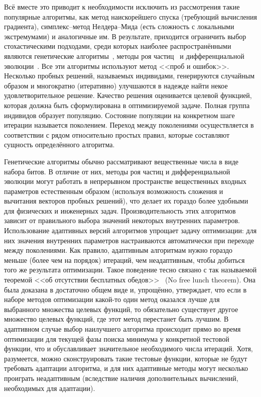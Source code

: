 Всё вместе это приводит к необходимости исключить из рассмотрения
такие популярные алгоритмы, как метод наискорейшего спуска (требующий
вычисления градиента), симплекс--метод Нелдера--Мида (есть сложность с
локальными экстремумами) и аналогичные им. В результате, приходится
ограничить выбор стохастическими подходами, среди которых наиболее
распространёнными являются генетические
алгоритмы~\cite{Goldberg-GA-1989}, методы  роя
частиц~\cite{Kennedy-PSO-1995} и дифференциальной
эволюции~\cite{Storn-DE-first-1997}.  Все эти алгоритмы используют
метод <<проб и ошибок>>.  Несколько пробных решений, называемых
индивидами, генерируются случайным образом и многократно (итеративно)
улучшаются в надежде найти некое удовлетворительное решение. Качество
решения оценивается целевой функцией, которая должна быть
сформулирована в оптимизируемой задаче.  Полная группа индивидов
образует популяцию.  Состояние популяции на конкретном шаге итерации
называется поколением.  Переход между поколениями осуществляется в
соответствии с рядом относительно простых правил, которые составляют
сущность определённого алгоритма.

Генетические алгоритмы обычно рассматривают вещественные числа в виде
набора битов.  В отличие от них, методы роя частиц и дифференциальной
эволюции могут работать в непрерывном пространстве вещественных
входных параметров естественным образом (используя возможность
сложения и вычитания векторов пробных решений), что делает их гораздо
более удобными для физических и инженерных задач.  Производительность
этих алгоритмов зависит от правильного выбора значений некоторых
внутренних параметров.  Использование адаптивных версий алгоритмов
упрощает задачу оптимизации: для них значения внутренних параметров
настраиваются автоматически при переходе между поколениями. Как
правило, адаптивным алгоритмам нужно гораздо меньше (более чем на
порядок) итераций, чем неадаптивным, чтобы добиться того же результата
оптимизации. Такое поведение тесно связано с так называемой теоремой
<<об отсутствии бесплатных обедов>>~\cite{Wolpert-NFL-1997} (No free
lunch theorem). Она была доказана в достаточно общем виде и,
упрощённо, утверждает, что если в наборе методов оптимизации какой-то
один метод оказался лучше для выбранного множества целевых функций, то
обязательно существует другое множество целевых функций, где этот
метод перестанет быть лучшим. В адаптивном случае выбор наилучшего
алгоритма происходит прямо во время оптимизации для текущей фазы
поиска минимума у конкретной тестовой функции, что и обуславливает
значительное необходимого числа итераций. Хотя, разумеется, можно
сконструировать такие тестовые функции, которые не будут требовать
адаптации алгоритма, и для них адаптивные методы могут несколько
проиграть неадаптивным (вследствие наличия дополнительных вычислений,
необходимых для адаптации).


